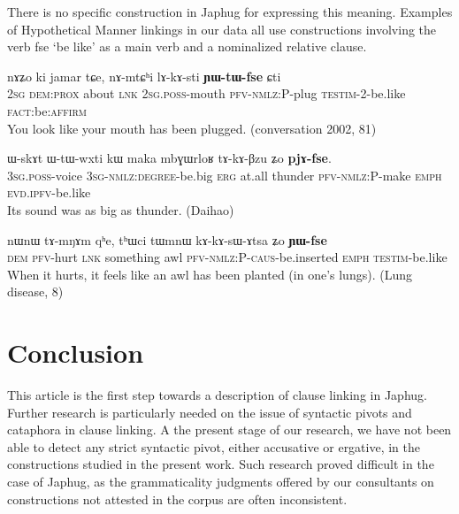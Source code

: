 \documentclass[oldfontcommands,oneside,a4paper,11pt]{article}
\newcommand{\ipa}[1]{{\phon \mbox{#1}}} %
\begin{document}
There is no specific construction in Japhug for expressing this meaning. Examples of Hypothetical Manner linkings in our data all use constructions involving the verb \ipa{fse} `be like' as a main verb and a nominalized relative clause.

\begin{exe}
\ex \label{ex:lAkAsti.YWtWfse}
\gll
\ipa{nɤʑo}         	\ipa{ki}         	\ipa{jamar}         	\ipa{tɕe,}         	\ipa{nɤ-mtɕʰi}         	\ipa{lɤ-kɤ-sti}         	\ipa{\textbf{ɲɯ-tɯ-fse}}         	\ipa{ɕti}     \\    
\textsc{2sg} \textsc{dem:prox} about \textsc{lnk} \textsc{2sg.poss}-mouth \textsc{pfv-nmlz:P}-plug \textsc{testim}-2-be.like \textsc{fact}:be:\textsc{affirm} \\
\glt You look like your mouth has been plugged. (conversation 2002, 81)
\end{exe}


\begin{exe}
\ex \label{ex:mbGWrloR.tAkABzu}
\gll
      	\ipa{ɯ-skɤt}         	\ipa{ɯ-tɯ-wxti}         	\ipa{kɯ}         	\ipa{maka}         	\ipa{mbɣɯrloʁ}         	\ipa{tɤ-kɤ-βzu}         	\ipa{ʑo}         	\ipa{\textbf{pjɤ-fse}.}         \\
  \textsc{3sg.poss}-voice \textsc{3sg-nmlz:degree}-be.big \textsc{erg} at.all thunder \textsc{pfv-nmlz:P}-make \textsc{emph} \textsc{evd.ipfv}-be.like \\
\glt Its sound was as big as thunder.  (Daihao)
\end{exe}
\begin{exe}
\ex \label{ex:tWmnW.tAkAsAtsa}
\gll
\ipa{nɯnɯ}         	\ipa{tɤ-mŋɤm}         	\ipa{qʰe,}         	\ipa{tʰɯci}         	\ipa{tɯmnɯ}         	\ipa{kɤ-kɤ-sɯ-ɤtsa}         	\ipa{ʑo}         	\ipa{\textbf{ɲɯ-fse}}         \\
\textsc{dem} \textsc{pfv}-hurt \textsc{lnk} something awl \textsc{pfv-nmlz:P-caus}-be.inserted  \textsc{emph} \textsc{testim}-be.like \\
\glt  When it hurts, it feels like an awl has been planted (in one's lungs).  (Lung disease, 8)
\end{exe}
 


\section{Conclusion}
This article is the first step towards a description of clause linking in Japhug. Further research is particularly needed on the issue of syntactic pivots and cataphora in clause linking. A the present stage of our research, we have not been able to detect any strict syntactic pivot, either accusative or ergative,  in the constructions studied in the present work. Such research  proved difficult in the case of Japhug,   as the grammaticality judgments offered by our consultants on constructions not attested in the corpus  are often inconsistent. 
\end{document}
